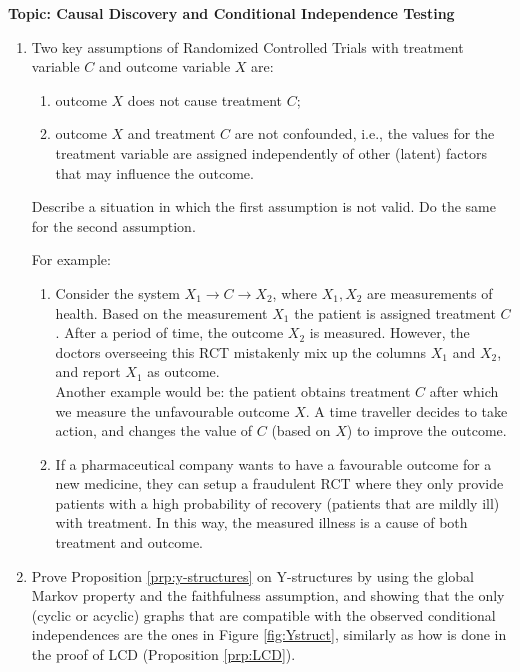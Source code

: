 
\flushleft\textbf{Topic: Causal Discovery and Conditional Independence Testing}

\begin{enumerate}[label=15.\arabic*]
	\item %
	Two key assumptions of Randomized Controlled Trials with treatment variable $C$ and outcome variable $X$ are:
	\begin{enumerate}
		\item outcome $X$ does not cause treatment $C$;
		\item outcome $X$ and treatment $C$ are not confounded, i.e., the values for
		the treatment variable are assigned independently of other (latent) factors that may influence
		the outcome.
	\end{enumerate}

	Describe a situation in which the first assumption is not valid. Do the same for the second assumption.

	\begin{ungradedsolution}
		For example:
		\begin{enumerate}
			\item Consider the system $X_1 \to C \to X_2$, where $X_1, X_2$ are measurements of health. Based on the measurement $X_1$ the patient is assigned treatment $C$. After a period of time, the outcome $X_2$ is measured. However, the doctors overseeing this RCT mistakenly mix up the columns $X_1$ and $X_2$, and report $X_1$ as outcome.\\
			Another example would be: the patient obtains treatment $C$ after which we measure the unfavourable outcome $X$. A time traveller decides to take action, and changes the value of $C$ (based on $X$) to improve the outcome.
			\item If a pharmaceutical company wants to have a favourable outcome for a new medicine, they can setup a fraudulent RCT where they only provide patients with a high probability of recovery (patients that are mildly ill) with treatment. In this way, the measured illness is a cause of both treatment and outcome.
		\end{enumerate}
	\end{ungradedsolution}

	\item %
	Prove Proposition \ref*{prp:y-structures} on Y-structures by using the global Markov property and the faithfulness assumption, and showing that the only (cyclic or acyclic) graphs that are compatible with the observed
	conditional independences are the ones in Figure \ref*{fig:Ystruct}, similarly as how is done in the proof of LCD (Proposition \ref*{prp:LCD}).


\end{enumerate}
